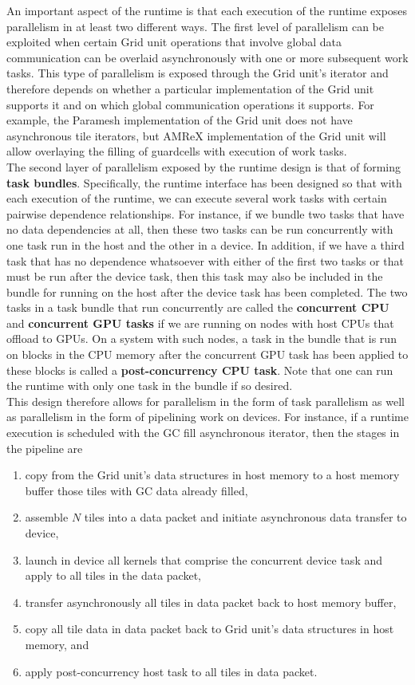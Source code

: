 \documentclass{article}
\begin{document}
An important aspect of the runtime is that each execution of the runtime exposes
parallelism in at least two different ways.  The first level of parallelism can
be exploited when certain Grid unit operations that involve global data
communication can be overlaid asynchronously with one or more subsequent work
tasks.  This type of parallelism is exposed through the Grid unit's iterator and
therefore depends on whether a particular implementation of the Grid unit
supports it and on which global communication operations it supports.  For
example, the Paramesh implementation of the Grid unit does not have asynchronous
tile iterators, but AMReX implementation of the Grid unit will allow overlaying
the filling of guardcells with execution of work tasks.\\

The second layer of parallelism exposed by the runtime design is that of forming
\textbf{task bundles}.  Specifically, the runtime interface has been designed so
that with each execution of the runtime, we can execute several work tasks with
certain pairwise dependence relationships.  For instance, if we bundle two tasks
that have no data dependencies at all, then these two tasks can be run
concurrently with one task run in the host and the other in a device.  In
addition, if we have a third task that has no dependence whatsoever with either
of the first two tasks or that must be run after the device task, then this
task may also be included in the bundle for running on the host after the device
task has been completed.  The two tasks in a task bundle that run concurrently
are called the \textbf{concurrent CPU} and \textbf{concurrent GPU tasks} if we are
running on nodes with host CPUs that offload to GPUs.  On a system with such nodes, a
task in the bundle that is run on blocks in the CPU memory after the concurrent
GPU task has been applied to these blocks is called a \textbf{post-concurrency
CPU task}.  Note that one can run the runtime with only one task in the bundle
if so desired.\\

This design therefore allows for parallelism in the form of task parallelism as
well as parallelism in the form of pipelining work on devices.  For instance, if a
runtime execution is scheduled with the GC fill asynchronous iterator, then the
stages in the pipeline are
\begin{enumerate}
\item{copy from the Grid unit's data structures in host memory to a host memory
buffer those tiles with GC data already filled,}
\item{assemble $N$ tiles into a data packet and initiate asynchronous data
transfer to device,}
\item{launch in device all kernels that comprise the concurrent device task and
apply to all tiles in the data packet,}
\item{transfer asynchronously all tiles in data packet back to host memory
buffer,}
\item{copy all tile data in data packet back to Grid unit's data structures in
host memory, and}
\item{apply post-concurrency host task to all tiles in data packet.}
\end{enumerate}
\end{document}
